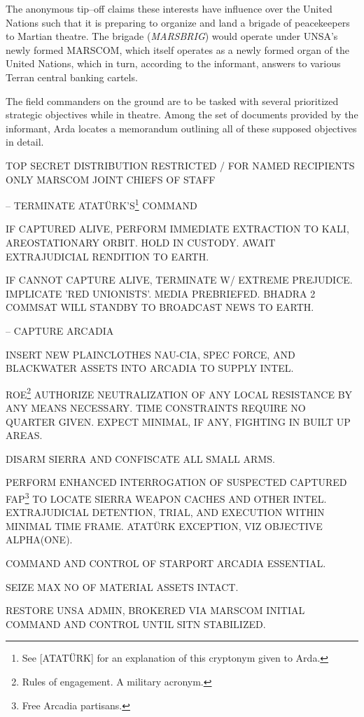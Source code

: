 The anonymous tip--off claims these interests have influence over the United Nations such that it is preparing to organize and land a brigade of peacekeepers to Martian theatre. The brigade ({\it MARSBRIG}) would operate under UNSA's newly formed MARSCOM, which itself operates as a newly formed organ of the United Nations, which in turn, according to the informant, answers to various Terran central banking cartels.

The field commanders on the ground are to be tasked with several prioritized strategic objectives while in theatre. Among the set of documents provided by the informant, Arda locates a memorandum outlining all of these supposed objectives in detail.

\startTimelineCorrespondenceDocument
TOP SECRET
DISTRIBUTION RESTRICTED / FOR NAMED RECIPIENTS ONLY
MARSCOM JOINT CHIEFS OF STAFF
\startitemize[4]
\item {} -- TERMINATE ATATÜRK'S\footnote{See [ATATÜRK] for an explanation of this cryptonym given to Arda.} COMMAND

    \startitemize[n]
    \item IF CAPTURED ALIVE, PERFORM IMMEDIATE EXTRACTION TO KALI, AREOSTATIONARY ORBIT. HOLD IN CUSTODY. AWAIT EXTRAJUDICIAL RENDITION TO EARTH.
    \item IF CANNOT CAPTURE ALIVE, TERMINATE W/ EXTREME PREJUDICE. IMPLICATE 'RED UNIONISTS'. MEDIA PREBRIEFED. BHADRA 2 COMMSAT WILL STANDBY TO BROADCAST NEWS TO EARTH.
    \stopitemize

\item {} -- CAPTURE ARCADIA
    \startitemize[n]
    \item INSERT NEW PLAINCLOTHES NAU-CIA, SPEC FORCE, AND BLACKWATER ASSETS INTO ARCADIA TO SUPPLY INTEL.
    \item ROE\footnote{Rules of engagement. A military acronym.} AUTHORIZE NEUTRALIZATION OF ANY LOCAL RESISTANCE BY ANY MEANS NECESSARY. TIME CONSTRAINTS REQUIRE NO QUARTER GIVEN. EXPECT MINIMAL, IF ANY, FIGHTING IN BUILT UP AREAS.
    \item DISARM SIERRA AND CONFISCATE ALL SMALL ARMS.
    \item PERFORM ENHANCED INTERROGATION OF SUSPECTED CAPTURED FAP\footnote{Free Arcadia partisans.} TO LOCATE SIERRA WEAPON CACHES AND OTHER INTEL. EXTRAJUDICIAL DETENTION, TRIAL, AND EXECUTION WITHIN MINIMAL TIME FRAME. ATATÜRK EXCEPTION, VIZ OBJECTIVE ALPHA(ONE).
    \item COMMAND AND CONTROL OF STARPORT ARCADIA ESSENTIAL.
    \item SEIZE MAX NO OF MATERIAL ASSETS INTACT.
    \item RESTORE UNSA ADMIN, BROKERED VIA MARSCOM INITIAL COMMAND AND CONTROL UNTIL SITN STABILIZED.
    \stopitemize

